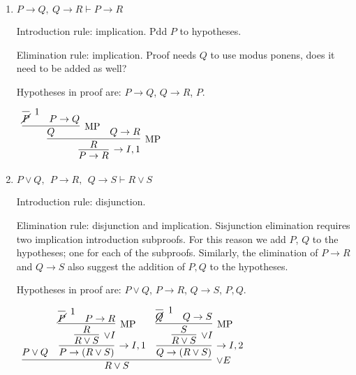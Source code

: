 \documentclass[11pt]{report}
\begin{document}
\begin{enumerate}
\begin{enumerate}
		\newpage
		\item $P \to Q, \ Q \to R \vdash P \to R $
				
		\hspace{0.2cm}{\bf Solution}

		Introduction rule: implication. Pdd $P$ to hypotheses.
			
		\vspace{0.2cm}
			
		Elimination rule: implication. Proof needs $Q$ to use modus ponens, does it need to be added as well?
		
		\vspace{0.2cm}

		Hypotheses in proof are: $P \to Q$, $Q \to R$, $P$.  
		
		\begin{mdframed}	
			\begin{center}
				$\begin{array}{c}
					\infer[\to I,1]{P \to R}
						{\infer[\MP]{R}
							{\infer[\MP]{Q}
								{\infer[1]{\cancel{P}}{} & P \to Q}
							&
							Q \to R}}
				\end{array}$
			\end{center}
		\end{mdframed}		
		
		\item $P \lor Q,\ \ P \to R,\ \ Q \to S \vdash  R \lor S$
				
		\hspace{0.2cm}{\bf Solution}

		Introduction rule: disjunction. 
			
		\vspace{0.2cm}
			
		Elimination rule: disjunction and implication. Sisjunction elimination requires two implication introduction subproofs. For this reason we add $P$, $Q$ to the hypotheses; one for each of the subproofs. Similarly, the elimination of $P\to R$ and $Q \to S$ also suggest the addition of $P,Q$ to the hypotheses. 
		
		\vspace{0.2cm}

		Hypotheses in proof are: $P \lor Q$, $P \to R$, $Q \to S$, $P,Q$. 

		\begin{mdframed}
			\begin{center}
				$\begin{array}{c}
					\infer[\lor E]{R \lor S}
						{P \lor Q
						&
						\infer[\to I,1]{P \to (R \lor S)}
							{\infer[\lor I]{R \lor S}
								{\infer[\MP]{R}
									{\infer[1]{\cancel{P}}{}
									&
									P \to R}}}
						&
						\infer[\to I,2]{Q \to (R \lor S)}
						{\infer[\lor I]{R \lor S}
							{\infer[\MP]{S}
								{\infer[1]{\cancel{Q}}{}
								&
								Q \to S}}}					 
						}				
				\end{array}$
			\end{center}
		\end{mdframed}
		

\end{enumerate}
\end{enumerate}
\end{document}
